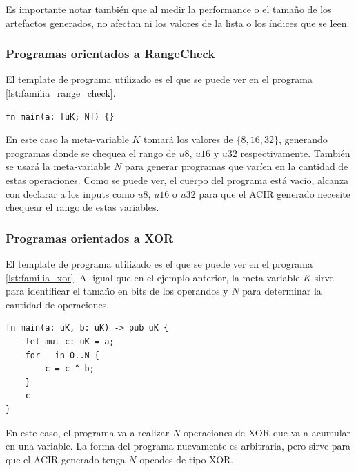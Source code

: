 \documentclass[11pt,a4paper]{tesis}
\begin{document}
Es importante notar también que al medir la performance o el tamaño de los artefactos generados, no afectan ni los valores de la lista o los índices que se leen. 

\subsubsection{\textbf{Programas orientados a RangeCheck}}
El template de programa utilizado es el que se puede ver en el programa \ref{lst:familia_range_check}.

\begin{listing}[H]
\caption{Familia de programas orientada a RangeCheck}
\label{lst:familia_range_check}
\begin{verbatim}
fn main(a: [uK; N]) {}
\end{verbatim}
\end{listing}

En este caso la meta-variable $K$ tomará los valores de $\{8, 16, 32\}$, generando programas donde se chequea el rango de $u8$, $u16$ y $u32$ respectivamente. También se usará la meta-variable $N$ para generar programas que varíen en la cantidad de estas operaciones. Como se puede ver, el cuerpo del programa está vacío, alcanza con declarar a los inputs como $u8$, $u16$ o $u32$ para que el ACIR generado necesite chequear el rango de estas variables. 


\subsubsection{\textbf{Programas orientados a XOR}}
El template de programa utilizado es el que se puede ver en el programa \ref{lst:familia_xor}. Al igual que en el ejemplo anterior, la meta-variable $K$ sirve para identificar el tamaño en bits de los operandos y $N$ para determinar la cantidad de operaciones. 

\begin{listing}[H]
\caption{Familia de programas orientada a XOR}
\label{lst:familia_xor}
\begin{verbatim}
fn main(a: uK, b: uK) -> pub uK {
    let mut c: uK = a;
    for _ in 0..N {
        c = c ^ b;
    }
    c
}
\end{verbatim}
\end{listing}

En este caso, el programa va a realizar $N$ operaciones de XOR que va a acumular en una variable. La forma del programa nuevamente es arbitraria, pero sirve para que el ACIR generado tenga $N$ opcodes de tipo XOR. 
\end{document}
